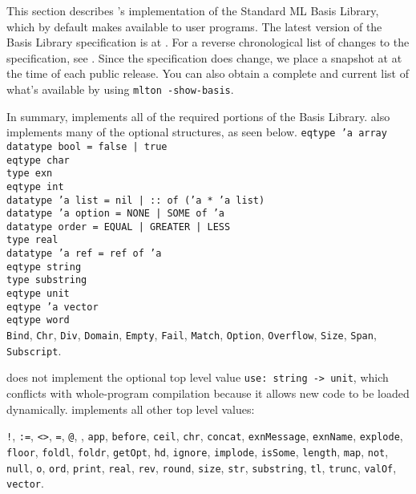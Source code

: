 %
This section describes {\mlton}'s implementation of the Standard ML
Basis Library, which by default {\mlton} makes available to user
programs.  The latest version of the Basis Library specification is at
.  For a reverse chronological
list of changes to the specification, see
.  Since the
specification does change, we place a snapshot at
 at the time of each {\mlton} public release.
You can also obtain a complete and current list of what's available by
using {\tt mlton -show-basis}.

In summary, {\mlton} implements all of the required portions of the
Basis Library.  {\mlton} also implements many of the optional
structures, as seen below.
%
{
\tt eqtype 'a array\\
\tt datatype bool = false | true\\
\tt eqtype char\\
\tt type exn\\
\tt eqtype int\\
\tt datatype 'a list = nil | :: of ('a * 'a list)\\
\tt datatype 'a option = NONE | SOME of 'a\\
\tt datatype order = EQUAL | GREATER | LESS\\
\tt type real\\
\tt datatype 'a ref = ref of 'a\\
\tt eqtype string\\
\tt type substring\\
\tt eqtype unit\\
\tt eqtype 'a vector\\
\tt eqtype word\\
}
%
{\tt Bind},
{\tt Chr},
{\tt Div},
{\tt Domain},
{\tt Empty},
{\tt Fail},
{\tt Match},
{\tt Option},
{\tt Overflow},
{\tt Size},
{\tt Span},
{\tt Subscript}.
%

{\mlton} does not implement the optional top level value
\verb+use: string -> unit+, which conflicts with whole-program
compilation because it allows new code to be loaded dynamically.
{\mlton} implements all other top level values:

{\tt !},
{\tt :=},
{\tt <>},
{\tt =},
{\tt @},
{\tt {}},
{\tt app},
{\tt before},
{\tt ceil},
{\tt chr},
{\tt concat},
{\tt exnMessage},
{\tt exnName},
{\tt explode},
{\tt floor},
{\tt foldl},
{\tt foldr},
{\tt getOpt},
{\tt hd},
{\tt ignore},
{\tt implode},
{\tt isSome},
{\tt length},
{\tt map},
{\tt not},
{\tt null},
{\tt o},
{\tt ord},
{\tt print},
{\tt real},
{\tt rev},
{\tt round},
{\tt size},
{\tt str},
{\tt substring},
{\tt tl},
{\tt trunc},
{\tt valOf},
{\tt vector}.


